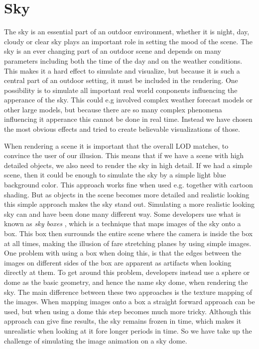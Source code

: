 
\chapter{Sky}
The sky is an essential part of an outdoor environment, whether it is
night, day, cloudy or clear sky plays an important role in setting the
mood of the scene. 
The sky is an ever changing part of an outdoor scene
and depends on many parameters including both the time of the day and
on the weather conditions.
%
This makes it a hard effect to simulate and visualize, but because it
is such a central part of an outdoor setting, it must be included in
the rendering.
%
One possibility is to simulate all important real world conponents
influencing the apperance of the sky. This could e.g involved complex
weather forecast models or other large models, but because there are
so many complex phenomena influencing it apperance this cannot be done
in real time. Instead we have chosen the most obvious effects and
tried to create believable visualizations of those.

When rendering a scene it is important that the overall LOD
matches, to convince the user of our illusion. This means that if we
have a scene with high detailed objects, we also need to render the
sky in high detail. If we had a simple scene, then it could be enough to
simulate the sky by a simple light blue background color. This
approach works fine when used e.g. together with cartoon shading. But
as objects in the scene becomes more detailed and realistic looking
this simple approach makes the sky stand out. 
%
Simulating a more realistic looking sky can and have been done many
different way. Some developers use what is known as \emph{sky boxes}
,
which is a technique that maps images of the sky onto a box. This box
then surrounds the entire scene where the camera is inside the box at
all times, making the illusion of fare stretching planes by using
simple images.
%
One problem with using a box when doing this, is that the edges
between the images on different sides of the box are apparent as
artifacts when looking directly at them. To get around this problem,
developers instead use a sphere or dome as the basic geometry, and
hence the name sky dome, when rendering the sky. The main difference
between these two approaches is the texture mapping of the
images. When mapping images onto a box a straight forward approach can
be used, but when using a dome this step becomes much more tricky.
%
Although this approach can give fine results, the sky remains frozen
in time, which makes it unrealistic when looking at it fore longer
periods in time. 
%
So we have take up the challenge of simulating the image animation on
a sky dome.


